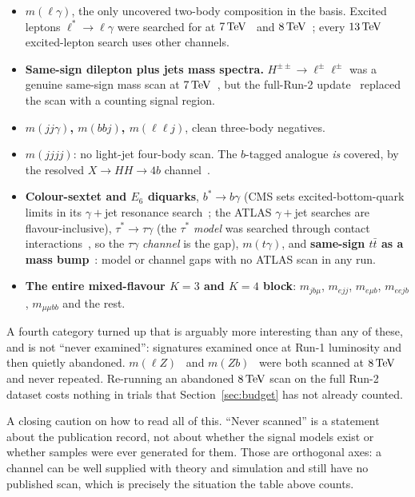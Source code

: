 \begin{itemize}[leftmargin=1.4em,itemsep=2pt]
  \item \textbf{$m(\ell\gamma)$}, the only uncovered two-body composition in the basis. Excited
        leptons $\ell^\ast \to \ell\gamma$ were searched for at $7\,\mathrm{TeV}$~\cite{atlas_lstar_7tev} and
        $8\,\mathrm{TeV}$~\cite{atlas_lstar_8tev}; every $13\,\mathrm{TeV}$ excited-lepton search uses other channels.
  \item \textbf{Same-sign dilepton plus jets mass spectra.} $H^{\pm\pm} \to \ell^\pm\ell^\pm$ was a
        genuine same-sign mass scan at $7\,\mathrm{TeV}$~\cite{atlas_dch_7tev}, but the full-Run-2
        update~\cite{atlas_dch_run2} replaced the scan with a counting signal region.
  \item \textbf{$m(jj\gamma)$, $m(bbj)$, $m(\ell\ell j)$}, clean three-body negatives.
  \item \textbf{$m(jjjj)$}: no light-jet four-body scan. The $b$-tagged analogue \emph{is} covered,
        by the resolved $X\to HH \to 4b$ channel~\cite{atlas_hh4b}.
  \item \textbf{Colour-sextet and $E_6$ diquarks}, \textbf{$b^\ast \to b\gamma$} (CMS sets excited-bottom-quark limits in its $\gamma+$jet resonance
search~\cite{cms_gammajet}; the ATLAS $\gamma+$jet searches are flavour-inclusive), \textbf{$\tau^\ast \to \tau\gamma$} (the $\tau^\ast$ \emph{model} was
        searched through contact interactions~\cite{atlas_taustar}, so the $\tau\gamma$
        \emph{channel} is the gap), \textbf{$m(t\gamma)$}, and \textbf{same-sign $t\bar t$ as a mass
        bump}~\cite{atlas_ss_tt}: model or channel gaps with no ATLAS scan in any run.
  \item \textbf{The entire mixed-flavour $K=3$ and $K=4$ block}: $m_{jb\mu}$, $m_{ejj}$,
        $m_{e\mu b}$, $m_{eejb}$, $m_{\mu\mu bb}$ and the rest.
\end{itemize}

A fourth category turned up that is arguably more interesting than any of these, and is not
``never examined'': signatures examined once at Run-1 luminosity and then quietly abandoned.
$m(\ell Z)$~\cite{atlas_vll_8tev} and $m(Zb)$~\cite{atlas_vlq_zb_8tev} were both scanned at
$8\,\mathrm{TeV}$ and never repeated. Re-running an abandoned $8\,\mathrm{TeV}$ scan on the full Run-2 dataset costs
nothing in trials that Section~\ref{sec:budget} has not already counted.

A closing caution on how to read all of this. ``Never scanned'' is a statement about the
publication record, not about whether the signal models exist or whether samples were ever
generated for them. Those are orthogonal axes: a channel can be well supplied with theory and
simulation and still have no published scan, which is precisely the situation the table above
counts.
